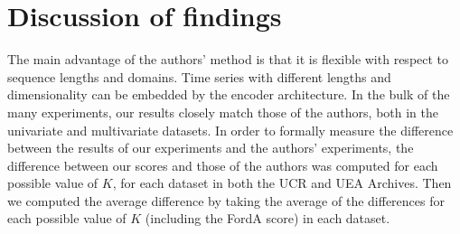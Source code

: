 \documentclass{article}
\begin{document}



\newpage
\section{Discussion of findings}
\label{sect:disc}
The main advantage of the authors' method is that it is flexible with respect to sequence lengths and domains. Time series with different lengths and dimensionality can be embedded by the encoder architecture. In the bulk of the many experiments, our results closely match those of the authors, both in the univariate and multivariate datasets. In order to formally measure the difference between the results of our experiments and the authors' experiments, the difference between our scores and those of the authors was computed for each possible value of $K$, for each dataset in both the UCR and UEA Archives. Then we computed the average difference by taking the average of the differences for each possible value of $K$ (including the FordA score) in each dataset.
\end{document}
